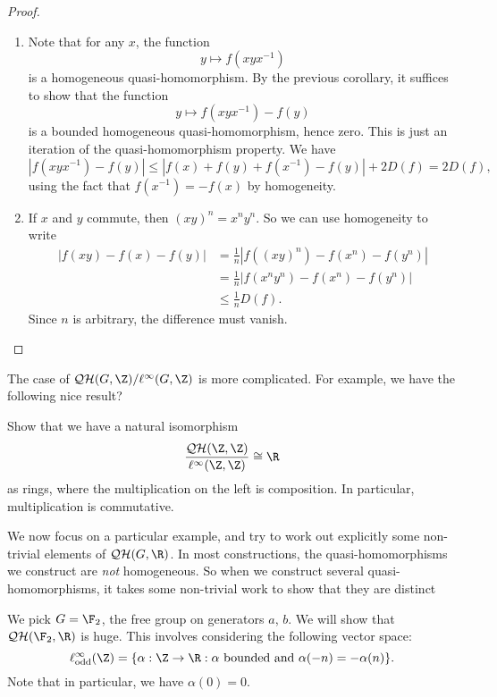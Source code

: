 \documentclass[a4paper]{article}
\newcommand\QH{\mathcal{QH}}
\begin{document}
\begin{proof}\leavevmode
  \begin{enumerate}
    \item Note that for any $x$, the function
      \[
        y \mapsto f(xyx^{-1})
      \]
      is a homogeneous quasi-homomorphism. By the previous corollary, it suffices to show that the function
      \[
        y \mapsto f(xyx^{-1}) - f(y)
      \]
      is a bounded homogeneous quasi-homomorphism, hence zero. This is just an iteration of the quasi-homomorphism property. We have
      \[
        |f(xyx^{-1}) - f(y)| \leq |f(x) + f(y) + f(x^{-1}) - f(y)| + 2D(f) = 2D(f),
      \]
      using the fact that $f(x^{-1}) = -f(x)$ by homogeneity.
    \item If $x$ and $y$ commute, then $(xy)^n = x^n y^n$. So we can use homogeneity to write
      \begin{align*}
        |f(xy) - f(x) - f(y)| &= \frac{1}{n} |f((xy)^n) - f(x^n) - f(y^n)|\\
        &= \frac{1}{n} | f(x^n y^n) - f(x^n) - f(y^n)|\\
        &\leq \frac{1}{n} D(f).
      \end{align*}
      Since $n$ is arbitrary, the difference must vanish.
  \end{enumerate}
\end{proof}

The case of $\QH(G, \Z)/\ell^\infty(G, \Z)$ is more complicated. For example, we have the following nice result?
\begin{ex}
  Show that we have a natural isomorphism
  \[
    \frac{\QH(\Z, \Z)}{\ell^\infty(\Z, \Z)} \cong \R
  \]
  as rings, where the multiplication on the left is composition. In particular, multiplication is commutative.
\end{ex}

We now focus on a particular example, and try to work out explicitly some non-trivial elements of $\QH(G, \R)$. In most constructions, the quasi-homomorphisms we construct are \emph{not} homogeneous. So when we construct several quasi-homomorphisms, it takes some non-trivial work to show that they are distinct

We pick $G = \F_2$, the free group on generators $a$, $b$. We will show that $\QH(\F_2, \R)$ is huge. This involves considering the following vector space:
\[
  \ell_{\mathrm{odd}}^\infty (\Z) = \{\alpha: \Z \to \R : \alpha \text{ bounded and } \alpha(-n) = -\alpha (n)\}.
\]
Note that in particular, we have $\alpha(0) = 0$.
\end{document}
